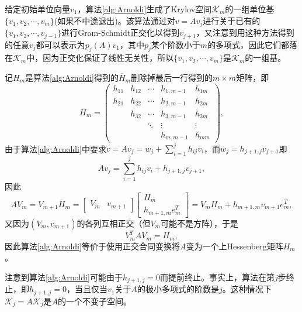 \documentclass[a4paper,10pt]{ctexart}
\begin{document}
给定初始单位向量$ v_{1} $，算法\ref{alg:Arnoldi}生成了Krylov空间$ \mathcal{K}_m $的一组单位基$ \{v_1, v_2, \cdots , v_m\} $(如果不中途退出)。该算法通过对$ v = Av_j $进行关于已有的$ \{v_1, v_2, \cdots , v_{j-1}\} $进行Gram-Schmidt正交化以得到$ v_{j+1} $，又注意到用这种方法得到的任意$ v_j $都可以表示为$ p_j(A) v_1 $，其中$ p_j $某个阶数小于$ m $的多项式，因此它们都落在$ \mathcal{K}_m $中，因为正交化保证了线性无关性，所以$ \{v_1, v_2, \cdots , v_m\} $是$ \mathcal{K}_m $的一组基。

记$ H_m $是算法\ref{alg:Arnoldi}得到的$ \overline{H}_m $删除掉最后一行得到的$ m\times m $矩阵，即
\[
    H_m = \begin{pmatrix}
        h_{11} & h_{12} & \cdots & h_{1,m-1} & h_{1m}\\
        h_{21} & h_{22} & \cdots & h_{2,m-1} & h_{2m}\\
         & h_{32} & \cdots & h_{3,m-1} & h_{3m}\\
         &  & \ddots & \vdots & \vdots\\
         &  &  & h_{m, m-1} & h_{mm}
    \end{pmatrix},
\]
由于算法\ref{alg:Arnoldi}中要求$ v = Av_j = w_j + \sum_{i=1}^j h_{ij}v_i $，而$ w_j = h_{j+1,j}v_{j+1} $即
\[
    Av_j = \sum_{i=1}^j h_{ij}v_i + h_{j+1,j}v_{j+1},
\]
因此
\begin{equation}
    AV_m = V_{m+1} \overline{H}_m = 
    \begin{bmatrix} 
        V_m  & v_{m+1}
    \end{bmatrix} 
    \begin{bmatrix} 
        H_m\\
        h_{m+1,m}e_m^T
    \end{bmatrix} = V_m H_m + h_{m+1,m}v_{m+1}e_m^T,
\end{equation}
又因为$ (V_m,v_{m+1}) $的各列互相正交（但$ V_m $可能不是方阵），于是
\begin{equation}
    V^T_m AV_m = H_m,
\end{equation}
因此算法\ref{alg:Arnoldi}等价于使用正交合同变换将$ A $变为一个上Hessenberg矩阵$ H_m $。

注意到算法\ref{alg:Arnoldi}可能由于$ h_{j+1,j} = 0 $而提前终止。事实上，算法在第$ j $步终止，即$ h_{j+1,j} = 0 $，当且仅当$ v_1 $关于$ A $的极小多项式的阶数是$ j $。这种情况下$ \mathcal{K}_j = A \mathcal{K}_j $是$ A $的一个不变子空间。
\end{document}
